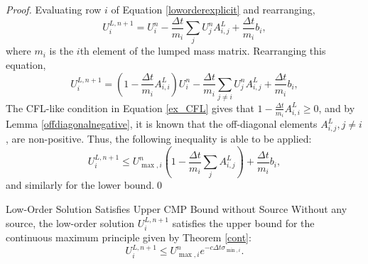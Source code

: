 \begin{proof}
Evaluating row $i$ of Equation \eqref{loworderexplicit} and rearranging,
\begin{equation}
   U_i^{L,n+1} = U_i^n - \frac{\Delta t}{m_i}\sum\limits_j U_j^n A^L_{i,j}
      + \frac{\Delta t}{m_i}b_i,
\end{equation}
where $m_i$ is the $i$th element of the lumped mass matrix.
Rearranging this equation,
\[
   U_i^{L,n+1} = \left(1-\frac{\Delta t}{m_i}A^L_{i,i}\right)U_i^n - \frac{\Delta t}{m_i}
      \sum\limits_{j\ne i} U_j^n A^L_{i,j} + \frac{\Delta t}{m_i}b_i,
\]
The CFL-like condition in Equation \eqref{ex_CFL} gives that $1-\frac{\Delta t}{m_i}A^L_{i,i} \ge 0$, and by
Lemma \ref{offdiagonalnegative}, it is known that the off-diagonal
elements $A^L_{i,j}, j\ne i$, are non-positive. Thus, the following inequality is
able to be applied:
\[
   U_i^{L,n+1} \le
   U_{\max,i}^n\left(1-\frac{\Delta t}{m_i}\sum\limits_j A^L_{i,j}\right)
      + \frac{\Delta t}{m_i}b_i,
\]
and similarly for the lower bound.\qed
\end{proof}
\begin{corollary}{Low-Order Solution Satisfies Upper CMP Bound without Source}\label{withoutsource}
   Without any source, the low-order solution $U_i^{L,n+1}$ satisfies the upper bound
   for the continuous maximum principle given by Theorem \ref{cont}:
   \begin{equation}\label{loworderDMP}
      U_i^{L,n+1} \le
      U_{\max,i}^n e^{-c\Delta t\sigma_{\min,i}}.
   \end{equation}
\end{corollary}


